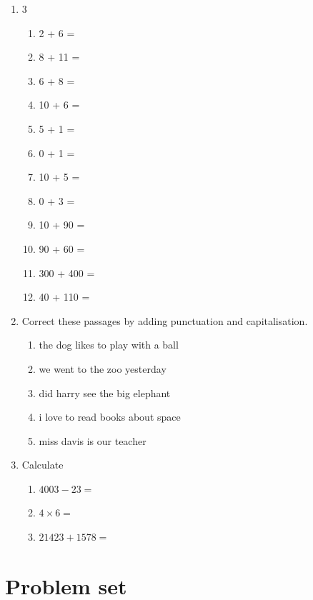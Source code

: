 \documentclass{tufte-book}
\begin{document}
\begin{enumerate}
\item
  \begin{multicols}{3}
    \begin{enumerate}\bigskip
      \item 2 + 6 = \dotfill\bigskip
      \item 8 + 11 = \dotfill\bigskip
      \item 6 + 8 = \dotfill\bigskip
      \item 10 + 6 = \dotfill
      \item 5 + 1 = \dotfill\bigskip
      \item 0 + 1 = \dotfill\bigskip
      \item 10 + 5 = \dotfill\bigskip
      \item 0 + 3 = \dotfill
      \item 10 + 90 = \dotfill\bigskip
      \item 90 + 60 = \dotfill\bigskip
      \item 300 + 400 = \dotfill\bigskip
      \item 40 + 110 = \dotfill
    \end{enumerate}
  \end{multicols}

  \item
  Correct these passages by adding punctuation and capitalisation.
  \begin{enumerate}\bigskip
    \item the dog likes to play with a ball\bigskip
    \item we went to the zoo yesterday\bigskip
    \item did harry see the big elephant\bigskip
    \item i love to read books about space\bigskip
    \item miss davis is our teacher
  \end{enumerate}

  \item
  Calculate
  \begin{enumerate}\bigskip
    \item $4003 - 23 = $\dotfill\bigskip
    \item $4\times6=$\dotfill\bigskip
    \item $21423 + 1578=$\dotfill\bigskip
  \end{enumerate}

\end{enumerate}

\clearpage\section{Problem set }
\end{document}
